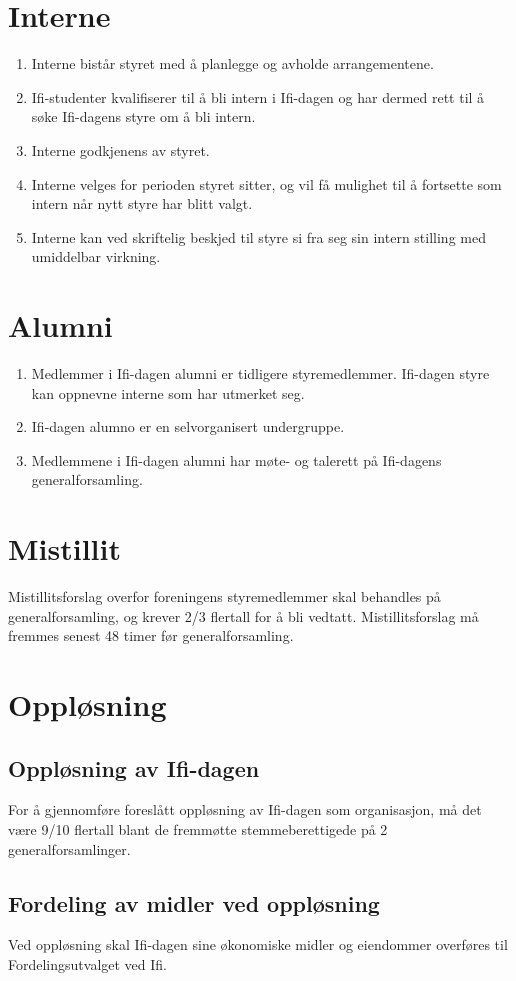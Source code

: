 \documentclass[norsk,a4paper]{article}
\begin{document}
\section{Interne}
\begin{enumerate}
    \item{Interne bistår styret med å planlegge og avholde arrangementene.}
    \item{Ifi-studenter kvalifiserer til å bli intern i Ifi-dagen og har dermed rett til å søke Ifi-dagens styre om å bli intern.}
    \item{Interne godkjenens av styret.}
    \item{Interne velges for perioden styret sitter, og vil få mulighet til å fortsette som intern når nytt styre har blitt valgt.}
    \item{Interne kan ved skriftelig beskjed til styre si fra seg sin intern stilling med umiddelbar virkning.}
\end{enumerate}

\section{Alumni}
\begin{enumerate}
    \item{Medlemmer i Ifi-dagen alumni er tidligere styremedlemmer. Ifi-dagen styre kan oppnevne interne som har utmerket seg.}
    \item{Ifi-dagen alumno er en selvorganisert undergruppe.}
    \item{Medlemmene i Ifi-dagen alumni har møte- og talerett på Ifi-dagens generalforsamling.}
\end{enumerate}

\section{Mistillit}
Mistillitsforslag overfor foreningens styremedlemmer skal behandles på generalforsamling, og krever 2/3 flertall for å bli vedtatt. Mistillitsforslag må fremmes senest 48 timer før generalforsamling.

\section{Oppløsning}
\subsection{Oppløsning av Ifi-dagen}
        For å gjennomføre foreslått oppløsning av Ifi-dagen som organisasjon, må det være 9/10 flertall
        blant de fremmøtte stemmeberettigede på 2 generalforsamlinger.
\subsection{Fordeling av midler ved oppløsning}
        Ved oppløsning skal Ifi-dagen sine økonomiske midler og eiendommer overføres til
        Fordelingsutvalget ved Ifi.
\end{document}

